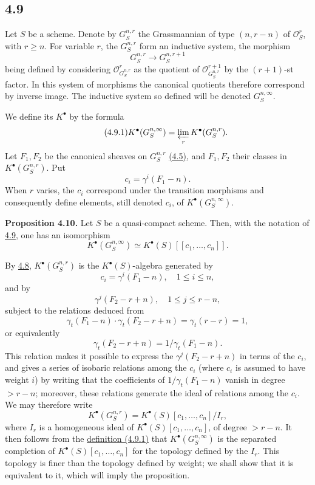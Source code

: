 \subsection*{4.9}
Let \(S\) be a scheme. Denote by \(G_S^{n,r}\) the Grassmannian of type \((n,r-n)\) of \(\mathcal O_S^r\), with \(r\ge n\). For variable \(r\), the \(G_S^{n,r}\) form an inductive system, the morphism
\[
  G_S^{n,r}\longrightarrow G_S^{n,r+1}
\]
being defined by considering \(\mathcal O_{G_S^{n,r}}^r\) as the quotient of \(\mathcal O_{G_S^{n,r}}^{r+1}\) by the \((r+1)\)-st factor. In this system of morphisms the canonical quotients therefore correspond by inverse image. The inductive system so defined will be denoted \(G_S^{n,\infty}\).

We define its \(K^\bullet\) by the formula
\begin{equation}\tag{4.9.1}
  K^\bullet(G_S^{n,\infty})
  = \varprojlim_r K^\bullet(G_S^{n,r}) .
\end{equation}
Let \(F_1,F_2\) be the canonical sheaves on \(G_S^{n,r}\) \hyperlink{sga6.e06.sec.4.5}{(4.5)}, and \(F_1,F_2\) their classes in \(K^\bullet(G_S^{n,r})\). Put
\[
  c_i=\gamma^i(F_1-n).
\]
When \(r\) varies, the \(c_i\) correspond under the transition morphisms and consequently define elements, still denoted \(c_i\), of \(K^\bullet(G_S^{n,\infty})\).

\textbf{Proposition 4.10.} Let \(S\) be a quasi-compact scheme. Then, with the notation of \hyperlink{sga6.e06.sec.4.9}{4.9}, one has an isomorphism
\[
  K^\bullet(G_S^{n,\infty})\simeq K^\bullet(S)[[c_1,\ldots,c_n]] .
\]

By \hyperlink{sga6.e06.cor.4-8}{4.8}, \(K^\bullet(G_S^{n,r})\) is the \(K^\bullet(S)\)-algebra generated by
\[
  c_i=\gamma^i(F_1-n),\quad 1\le i\le n,
\]
and by
\[
  \gamma^j(F_2-r+n),\quad 1\le j\le r-n,
\]
subject to the relations deduced from
\[
  \gamma_t(F_1-n)\cdot\gamma_t(F_2-r+n)
  = \gamma_t(r-r)=1,
\]
or equivalently
\[
  \gamma_t(F_2-r+n)=1/\gamma_t(F_1-n).
\]
This relation makes it possible to express the \(\gamma^j(F_2-r+n)\) in terms of the \(c_i\), and gives a series of isobaric relations among the \(c_i\) (where \(c_i\) is assumed to have weight \(i\)) by writing that the coefficients of \(1/\gamma_t(F_1-n)\) vanish in degree \(>r-n\); moreover, these relations generate the ideal of relations among the \(c_i\). We may therefore write
\[
  K^\bullet(G_S^{n,r})=K^\bullet(S)[c_1,\ldots,c_n]/I_r,
\]
where \(I_r\) is a homogeneous ideal of \(K^\bullet(S)[c_1,\ldots,c_n]\), of degree \(>r-n\). It then follows from the \hyperlink{sga6.e06.eq.4-9-1}{definition (4.9.1)} that \(K^\bullet(G_S^{n,\infty})\) is the separated completion of \(K^\bullet(S)[c_1,\ldots,c_n]\) for the topology defined by the \(I_r\). This topology is finer than the topology defined by weight; we shall show that it is equivalent to it, which will imply the proposition.

